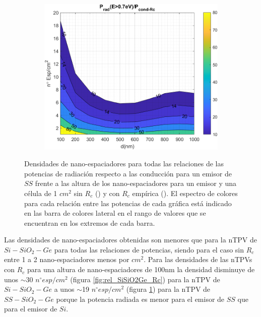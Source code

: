 \begin{figure}[H]
\begin{subfigure}[b]{0.49\textwidth}
			\includegraphics[width=1.00\textwidth]{figuras/Resultados/RelacionCondRad/SS_Rc_empirico.png}
		\caption{ }
		\label{fig:rel_SsSiO2Ge_Rc_emp}
	\end{subfigure}
	\caption{Densidades de nano-espaciadores para todas las relaciones de las potencias de radiación respecto a las conducción para un emisor de $SS$ frente a las altura de los nano-espaciadores para un emisor y una célula de 1 $cm^2$ sin $R_c$ () y con $R_c$ empírica (). El espectro de colores para cada relación entre las potencias de cada gráfica está indicado en las barra de colores lateral en el rango de valores que se encuentran en los extremos de cada barra.}
	\label{fig:rels_SsSiO2Ge_PnvsRc}
\end{figure}
Las densidades de nano-espaciadores obtenidas son menores que para la nTPV de $Si-SiO_2-Ge$ para todas las relaciones de potencias, siendo para el caso sin $R_c$ entre 1 a 2 nano-espaciadores menos por $cm^2$. Para las densidades de las nTPVs con $R_c$ para una altura de nano-espaciadores de 100nm la densidad disminuye de unos $\sim$30 $n^{\circ} esp/cm^2$ (figura \ref{fig:rel_SiSiO2Ge_Rc}) para la nTPV de $Si-SiO_2-Ge$ a unos $\sim$19 $n^{\circ} esp/cm^2$ (figura \ref{fig:rel_SsSiO2Ge_Rc_emp}) para la nTPV de $SS-SiO_2-Ge$ porque la potencia radiada es menor para el emisor de $SS$ que para el emisor de $Si$.
